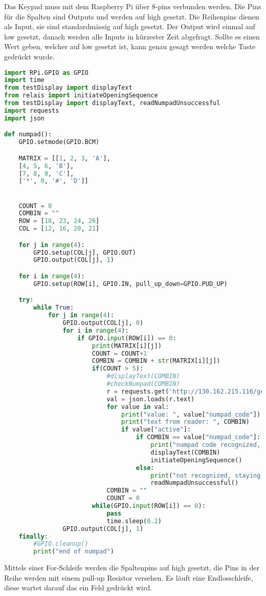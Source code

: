 Das Keypad muss mit dem Raspberry Pi über 8-pins verbunden werden. Die Pins für die Spalten sind Outputs und werden auf high gesetzt. Die Reihenpins dienen als Input, sie sind standardmässig auf high gesetzt. Der Output wird einmal auf low gesetzt, danach werden alle Inputs in kürzester Zeit abgefragt. Sollte es einen Wert geben, welcher auf low gesetzt ist, kann genau gesagt werden welche Taste gedrückt wurde.
\begin{lstlisting}[language=python, caption=Numpad.py]
    import RPi.GPIO as GPIO
import time
from testDisplay import displayText
from relais import initiateOpeningSequence
from testDisplay import displayText, readNumpadUnsuccessful
import requests
import json

def numpad():
    GPIO.setmode(GPIO.BCM)

    MATRIX = [[1, 2, 3, 'A'],
    [4, 5, 6, 'B'],
    [7, 8, 9, 'C'],
    ['*', 0, '#', 'D']]


    COUNT = 0
    COMBIN = ""
    ROW = [18, 23, 24, 26]
    COL = [12, 16, 20, 21]

    for j in range(4):
        GPIO.setup(COL[j], GPIO.OUT)
        GPIO.output(COL[j], 1)

    for i in range(4):
        GPIO.setup(ROW[i], GPIO.IN, pull_up_down=GPIO.PUD_UP)

    try:
        while True:
            for j in range(4):
                GPIO.output(COL[j], 0)
                for i in range(4):
                    if GPIO.input(ROW[i]) == 0:
                        print(MATRIX[i][j])
                        COUNT = COUNT+1
                        COMBIN = COMBIN + str(MATRIX[i][j])
                        if(COUNT > 5):
                            #displayText(COMBIN)
                            #checkNumpad(COMBIN)
                            r = requests.get('http://130.162.215.116/get-numpad-codes')
                            val = json.loads(r.text)
                            for value in val:
                                print("value: ", value["numpad_code"])
                                print("text from reader: ", COMBIN)
                                if value["active"]:
                                    if COMBIN == value["numpad_code"]:
                                        print("numpad code recognized, initiating opening sequence")
                                        displayText(COMBIN)
                                        initiateOpeningSequence()
                                    else:
                                        print("not recognized, staying closed")
                                        readNumpadUnsuccessful()
                            COMBIN = ""
                            COUNT = 0
                        while(GPIO.input(ROW[i]) == 0):
                            pass
                            time.sleep(0.2)
                GPIO.output(COL[j], 1)
    finally:
        #GPIO.cleanup()
        print("end of numpad")

\end{lstlisting}

Mittels einer For-Schleife werden die Spaltenpins auf high gesetzt, die Pins in der Reihe werden mit einem pull-up Resistor versehen. Es läuft eine Endlosschleife, diese wartet darauf das ein Feld gedrückt wird.